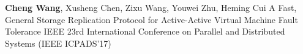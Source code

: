 \cvpub
{\textbf{Cheng Wang}, Xusheng Chen, Zixu Wang, Youwei Zhu, Heming Cui} %
{A Fast, General Storage Replication Protocol for Active-Active Virtual Machine Fault  Tolerance} %
{} %
{} %
{ %
IEEE 23rd International Conference on Parallel and Distributed Systems (IEEE ICPADS'17)\newline
}

